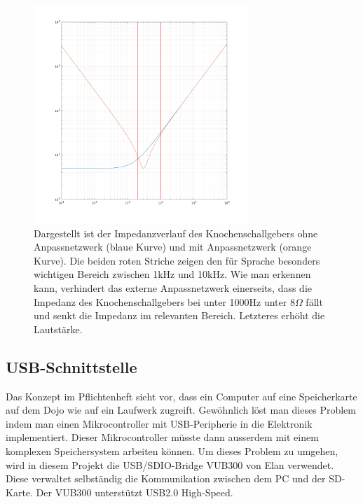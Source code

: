   \begin{figure}[h]
	\centering
	\includegraphics[width=0.72\textwidth]{graphics/RLGlied.png}
	\caption{Dargestellt ist der Impedanzverlauf des Knochenschallgebers ohne Anpassnetzwerk (blaue Kurve) und mit Anpassnetzwerk (orange Kurve). Die beiden roten Striche zeigen den für Sprache besonders wichtigen Bereich zwischen 1kHz und 10kHz.
	Wie man erkennen kann, verhindert das externe Anpassnetzwerk einerseits, dass die Impedanz des Knochenschallgebers bei unter 1000Hz unter 8\(\Omega\) fällt und senkt die Impedanz im relevanten Bereich. Letzteres erhöht die Lautstärke.}
	\label{fig:Impedanz_Knochenschall_modell}
  \end{figure}
  
  



\subsection{USB-Schnittstelle}\label{sec:USB}
Das Konzept im Pflichtenheft sieht vor, dass ein Computer auf eine Speicherkarte auf dem Dojo wie auf ein Laufwerk zugreift. Gewöhnlich löst man dieses Problem indem man einen Mikrocontroller mit USB-Peripherie in die Elektronik implementiert.
Dieser Mikrocontroller müsste dann ausserdem mit einem komplexen Speichersystem arbeiten können. Um dieses Problem zu umgehen, wird in diesem Projekt die USB/SDIO-Bridge VUB300 von Elan verwendet. Diese verwaltet selbständig die Kommunikation zwischen dem PC und der SD-Karte.
Der VUB300 unterstützt USB2.0 High-Speed. 

